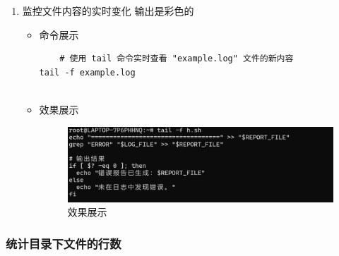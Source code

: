\documentclass[UTF8]{ctexart}
\begin{document}
\begin{enumerate}
  \item 监控文件内容的实时变化
输出是彩色的
  \begin{itemize}
  \item 命令展示
  \begin{verbatim}
    # 使用 tail 命令实时查看 "example.log" 文件的新内容
tail -f example.log
    
  \end{verbatim}

  \item 效果展示
  \begin{figure}[H]
    \centering
    \includegraphics[width=\textwidth]{14} %
    \caption{效果展示}
  
  \end{figure}
\end{itemize}
\end{enumerate}
\subsubsection{统计目录下文件的行数}
\end{document}
